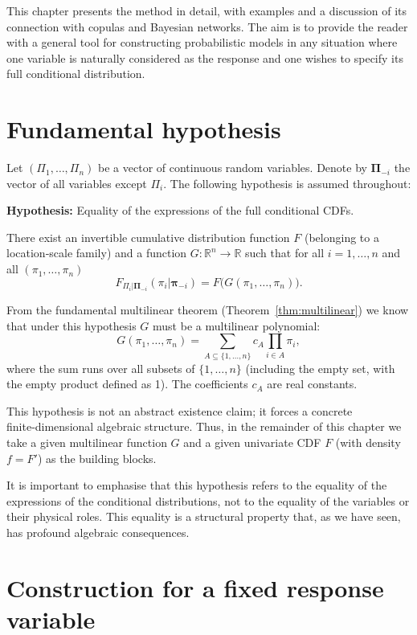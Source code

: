 This chapter presents the method in detail, with examples and a discussion of its connection with copulas and Bayesian networks. The aim is to provide the reader with a general tool for constructing probabilistic models in any situation where one variable is naturally considered as the response and one wishes to specify its full conditional distribution.

\section{Fundamental hypothesis}
\label{sec:cc-hypothesis}

Let \((\Pi_1,\ldots,\Pi_n)\) be a vector of continuous random variables. Denote by \(\boldsymbol{\Pi}_{-i}\) the vector of all variables except \(\Pi_i\). The following hypothesis is assumed throughout:

\textbf{Hypothesis: }Equality of the expressions of the full conditional CDFs.

There exist an invertible cumulative distribution function \(F\) (belonging to a location‑scale family) and a function \(G:\mathbb{R}^n\to\mathbb{R}\) such that for all \(i=1,\ldots,n\) and all \((\pi_1,\ldots,\pi_n)\)
\[
F_{\Pi_i|\boldsymbol{\Pi}_{-i}}(\pi_i|\boldsymbol{\pi}_{-i}) = F\bigl(G(\pi_1,\ldots,\pi_n)\bigr).
\]

From the fundamental multilinear theorem (Theorem~\ref{thm:multilinear}) we know that under this hypothesis \(G\) must be a multilinear polynomial:
\[
G(\pi_1,\ldots,\pi_n) = \sum_{A\subseteq\{1,\ldots,n\}} c_A \prod_{i\in A} \pi_i,
\]
where the sum runs over all subsets of \(\{1,\ldots,n\}\) (including the empty set, with the empty product defined as 1). The coefficients \(c_A\) are real constants.

This hypothesis is not an abstract existence claim; it forces a concrete finite‑dimensional algebraic structure. Thus, in the remainder of this chapter we take a given multilinear function \(G\) and a given univariate CDF \(F\) (with density \(f=F'\)) as the building blocks.

It is important to emphasise that this hypothesis refers to the equality of the expressions of the conditional distributions, not to the equality of the variables or their physical roles. This equality is a structural property that, as we have seen, has profound algebraic consequences.

\section{Construction for a fixed response variable}
\label{sec:cc-construction}

